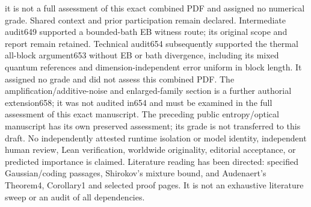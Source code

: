 \documentclass[11pt]{article}
\begin{document}
it is not a full assessment of this exact combined PDF and assigned
no numerical grade. Shared context and prior participation remain
declared. Intermediate audit649 supported a bounded-bath EB witness route;
its original scope and report remain retained. Technical audit654
subsequently supported the thermal all-block argument653 without EB
or bath divergence, including its mixed quantum references and
dimension-independent error uniform in block length.
It assigned no grade and did not assess this combined PDF.
The amplification/additive-noise and enlarged-family section is a
further authorial extension658; it was not audited in654 and must be
examined in the full assessment of this exact manuscript.
The preceding public entropy/optical manuscript has its own preserved
assessment; its grade is not transferred to this draft.
No independently attested runtime isolation or model identity,
independent human review, Lean verification, worldwide originality,
editorial acceptance, or predicted importance is claimed.
Literature reading has been directed: specified Gaussian/coding
passages, Shirokov's mixture bound, and Audenaert's Theorem4, Corollary1
and selected proof pages. It is not an exhaustive literature sweep
or an audit of all dependencies.
\end{document}
